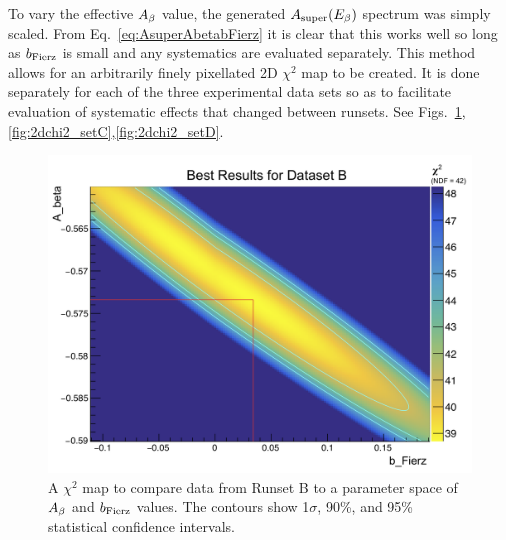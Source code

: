 To vary the effective $A_{\beta}$ value, the generated $A_{\mathrm{super}}(E_{\beta})$ spectrum was simply scaled.  From Eq.~\ref{eq:AsuperAbetabFierz} it is clear that this works well so long as $b_{\mathrm{Fierz}}$ is small and any systematics are evaluated separately.  This method allows for an arbitrarily finely pixellated 2D $\chi^2$ map to be created.  It is done separately for each of the three experimental data sets so as to facilitate evaluation of systematic effects that changed between runsets.  See Figs.~\ref{fig:2dchi2_setB},\ref{fig:2dchi2_setC},\ref{fig:2dchi2_setD}.

\begin{figure}[h!tb]
	\centering
	\includegraphics[width=.999\linewidth]
	{Figures/Chi2_2D_SetB.png}
	\caption[$\chi^2$ Map for Runset B]{A $\chi^2$ map to compare data from Runset B to a parameter space of $A_{\beta}$ and $b_{\mathrm{Fierz}}$ values.  The contours show 1$\sigma$, 90\%, and 95\% statistical confidence intervals.}	
	\label{fig:2dchi2_setB}
\end{figure}
%
